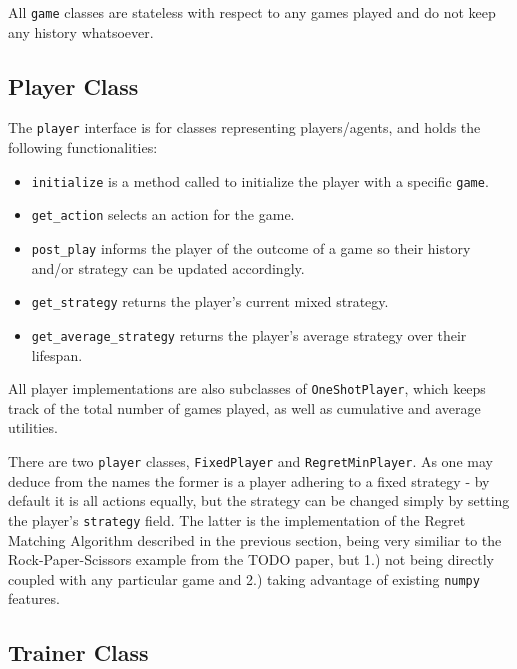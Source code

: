 \documentclass [11pt]{article}
\begin{document}
All \texttt{game} classes are stateless with respect to any games played and do not keep any history whatsoever.


\subsection{Player Class}

The \texttt{player} interface is for classes representing players/agents, and holds the following functionalities:

\begin{itemize}
  \item \texttt{initialize} is a method called to initialize the player with a specific \texttt{game}.
  \item \texttt{get\_action} selects an action for the game.
  \item \texttt{post\_play} informs the player of the outcome of a game so their history and/or strategy can be updated accordingly.
  \item \texttt{get\_strategy} returns the player's current mixed strategy.
  \item \texttt{get\_average\_strategy} returns the player's average strategy over their lifespan.
\end{itemize}

All player implementations are also subclasses of \texttt{OneShotPlayer}, which keeps track of the total number of games played, as well as cumulative and average utilities.

There are two \texttt{player} classes, \texttt{FixedPlayer} and \texttt{RegretMinPlayer}. As one may deduce from the names the former is a player adhering to a fixed strategy - by default it is all actions equally, but the strategy can be changed simply by setting the player's \texttt{strategy} field. The latter is the implementation of the Regret Matching Algorithm described in the previous section, being very similiar to the Rock-Paper-Scissors example from the TODO paper, but 1.) not being directly coupled with any particular game and 2.) taking advantage of existing \texttt{numpy} features.

\subsection{Trainer Class}
\end{document}
